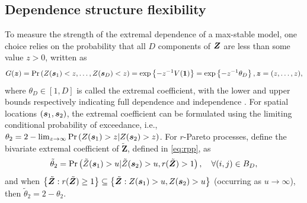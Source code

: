 \documentclass[12pt]{article}
\begin{document}
\subsection{Dependence structure flexibility}
\label{ssec:flex_dep}
To measure the strength of the extremal dependence of a max-stable model, one choice relies on the probability that all $D$ components of ${\boldsymbol{Z}}$ are less than some value $z>0$, 
written as
%
\begin{align*}
G({\boldsymbol{z}}) 
= {\rm Pr} \left( Z({\boldsymbol{s}}_1) < z, \ldots, Z({\boldsymbol{s}}_D)< z \right)
= \exp \left\{ - z^{-1} V(\bm 1)\right\}
= \exp \left\{ - z^{-1} \theta_{D}\right\}, {\boldsymbol{z}} = (z, \ldots, z),
\end{align*}
%
where $\theta_{D} \in [1,D]$ is called the extremal coefficient,
with the lower and upper bounds respectively indicating full dependence and independence \citep[see][]{Smith:1990b, Davison.etal:2012}.
For spatial locations $({\boldsymbol{s}}_1, {\boldsymbol{s}}_2)$, the extremal coefficient can be formulated using the limiting conditional probability of exceedance, i.e., $\theta_{2}= 2-\lim_{z\to\infty}{\rm Pr}\left(Z({\boldsymbol{s}}_1)>z|Z({\boldsymbol{s}}_2)>z\right)$. 
%
For $r$-Pareto processes, \citet{deFondeville.Davison:2018} define the bivariate extremal coefficient of $\bm{\tilde Z}$, defined in \eqref{eq:rpp}, as 
\begin{equation*}
\tilde{\theta}_{2} = 
{\rm Pr}\left(\tilde{Z}({\boldsymbol{s}}_1)>u|\tilde{Z}({\boldsymbol{s}}_2)>u, r(\tilde{{\boldsymbol{Z}}})>1\right), \quad \forall (i,j) \in B_D, 
\end{equation*}
%
and when $\left\{ \tilde{{\boldsymbol{Z}}}: r(\tilde{{\boldsymbol{Z}}}) \geq 1 \right\} \subseteq \left\{ \tilde{{\boldsymbol{Z}}}: Z({\boldsymbol{s}}_1) >u, Z({\boldsymbol{s}}_2) >u \right\}$ (occurring as $u\rightarrow \infty$), then $\tilde{\theta}_{2} = 2 - \theta_{2}$. 
%
\end{document}
